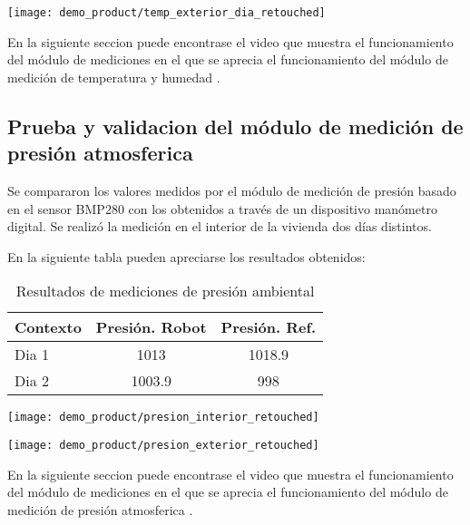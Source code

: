 \begin{center}
 \texttt{[image: demo\_product/temp\_exterior\_dia\_retouched]}
   \label{fig:humedad_interior}
\end{center}

En la siguiente seccion puede encontrase el video que muestra el funcionamiento del módulo de mediciones en el que se aprecia el funcionamiento del módulo de medición de temperatura y humedad \cite{Demo_Mediciones}.

\subsection{Prueba y validacion del módulo de medición de presión atmosferica}

Se compararon los valores medidos por el módulo de medición de presión basado en el sensor BMP280 con los obtenidos a través de un dispositivo manómetro digital. Se realizó la medición en el interior de la vivienda dos días distintos.

En la siguiente tabla pueden apreciarse los resultados obtenidos:

\begin{table}[h]
\centering
\caption[Resultados de mediciones de presión ambiental]{Resultados de mediciones de presión ambiental}
\begin{tabular}{l c c}
\toprule
\textbf{Contexto} & \textbf{Presión. Robot} & \textbf{Presión. Ref.} \\
\midrule
Dia 1 & 1013 & 1018.9 \\
Dia 2 & 1003.9 & 998 \\
\bottomrule
\hline
\end{tabular}
\end{table}

\begin{center}
 \texttt{[image: demo\_product/presion\_interior\_retouched]}
   \label{fig:humedad_interior}
\end{center}

\begin{center}
 \texttt{[image: demo\_product/presion\_exterior\_retouched]}
   \label{fig:humedad_interior}
\end{center}

En la siguiente seccion puede encontrase el video que muestra el funcionamiento del módulo de mediciones en el que se aprecia el funcionamiento del módulo de medición de presión atmosferica \cite{Demo_Mediciones}.

